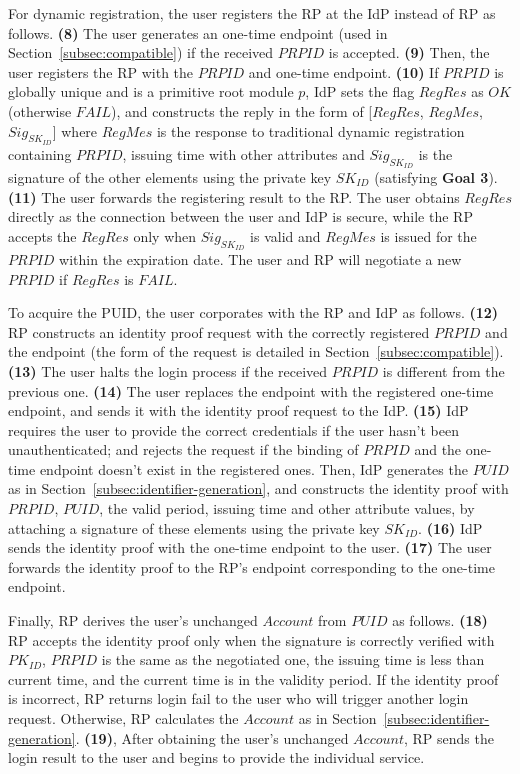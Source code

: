 For dynamic registration, the user registers the RP at the IdP instead of RP as follows. \textbf{(8)} The user generates an one-time endpoint (used in Section~\ref{subsec:compatible}) if the received $PRPID$ is accepted. \textbf{(9)} Then, the user registers the RP with the $PRPID$ and one-time endpoint. \textbf{(10)} If $PRPID$ is globally unique and is a primitive root module $p$, IdP sets the flag $RegRes$ as $OK$ (otherwise $FAIL$), and constructs the reply in the form of
[$RegRes$, $RegMes$, $Sig_{SK_{ID}}$]
where $RegMes$ is the response to traditional dynamic registration containing $PRPID$, issuing time with other attributes and $Sig_{SK_{ID}}$ is the signature of the other elements using the private key $SK_{ID}$ (satisfying \textbf{Goal 3}). \textbf{(11)} The user forwards the registering result to the RP. The user obtains $RegRes$ directly as the connection between the user and IdP is secure, while the RP accepts the $RegRes$ only when $Sig_{SK_{ID}}$ is valid
and $RegMes$ is issued for the $PRPID$ within the expiration date. The user and RP will negotiate a new $PRPID$ if $RegRes$ is $FAIL$.

To acquire the PUID, the user corporates with the RP and IdP as follows. \textbf{(12)} RP constructs an identity proof request with the correctly registered $PRPID$ and the endpoint (the form of the request is detailed in Section~\ref{subsec:compatible}). \textbf{(13)} The user halts the login process if the received $PRPID$ is different from the previous one. \textbf{(14)} The user replaces the endpoint with the registered one-time endpoint, and sends it with the identity proof request to the IdP. \textbf{(15)} IdP requires the user to provide the correct credentials if the user hasn't been unauthenticated; and rejects the request if the binding of $PRPID$ and the one-time endpoint doesn't exist in the registered ones. Then, IdP generates the $PUID$ as in Section~\ref{subsec:identifier-generation}, and constructs the identity proof with $PRPID$, $PUID$, the valid period, issuing time and other attribute values, by attaching a signature of these elements using the private key $SK_{ID}$. \textbf{(16)} IdP sends the identity proof with the one-time endpoint to the user. \textbf{(17)} The user forwards the identity proof to the RP's endpoint corresponding to the one-time endpoint.

Finally, RP derives the user's unchanged $Account$ from $PUID$ as follows. \textbf{(18)} RP accepts the identity proof only when the signature is correctly verified with $PK_{ID}$, $PRPID$ is the same as the negotiated one, the issuing time is less than current time, and the current time is in the validity period. If the identity proof is incorrect, RP returns login fail to the user who will trigger another login request. Otherwise, RP calculates the $Account$ as in Section~\ref{subsec:identifier-generation}. \textbf{(19)}, After obtaining the user's unchanged $Account$, RP sends the login result to the user and begins to provide the individual service.


